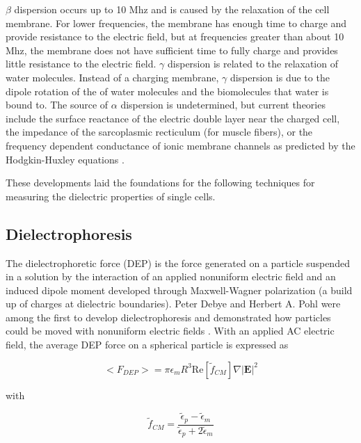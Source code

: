  \par $\beta$ dispersion occurs up to 10 Mhz and is caused by the relaxation of the cell membrane. For lower frequencies, the membrane has enough time to charge and provide resistance to the electric field, but at frequencies greater than about 10 Mhz, the membrane does not have sufficient time to fully charge and provides little resistance to the electric field. $\gamma$ dispersion is related to the relaxation of water molecules. Instead of a charging membrane, $\gamma$ dispersion is due to the dipole rotation of the of water molecules and the biomolecules that water is bound to. The source of $\alpha$ dispersion is undetermined, but current theories include the surface reactance of the electric double layer near the charged cell, the impedance of the sarcoplasmic recticulum (for muscle fibers), or the frequency dependent conductance of ionic membrane channels as predicted by the Hodgkin-Huxley equations \cite{schwan_electrical_1994}.
 
 
 \par These developments laid the foundations for the following techniques for measuring the dielectric properties of single cells. 
 
 \subsection{Dielectrophoresis}
 \par The dielectrophoretic force (DEP) is the force generated on a particle suspended in a solution by the interaction of an applied nonuniform electric field and an induced dipole moment developed through Maxwell-Wagner polarization (a build up of charges at dielectric boundaries). Peter Debye and Herbert A. Pohl were among the first to develop dielectrophoresis and demonstrated how particles could be moved with nonuniform electric fields \cite{muller_potential_2003}. With an applied AC electric field, the average DEP force on a spherical particle is expressed as \cite{morgan_single_2007, green_dielectrophoresis_1999}
 
 \begin{equation}
     \big< F_{DEP} \big> = \pi \epsilon_m R^3 \text{Re}[\tilde{f}_{CM}] \nabla |\textbf{E}|^2 
     \label{eqn:dep_force}
 \end{equation}
 
 \noindent with
 
 \begin{equation}
     \tilde{f}_{CM} = \frac{\tilde{\epsilon}_p - \tilde{\epsilon}_m}{\tilde{\epsilon}_p + 2\tilde{\epsilon}_m} 
     \label{eqn:fcm_background}
 \end{equation}
 
